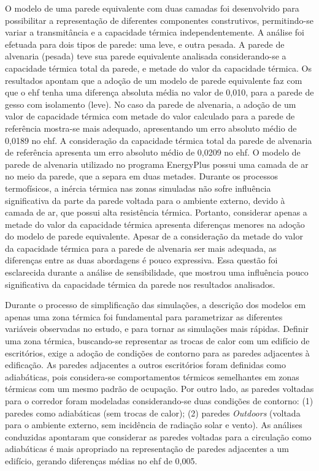\documentclass[brazil,hardcopy,openany]{ufscthesis} %
\begin{document}
	O modelo de uma parede equivalente com duas camadas foi desenvolvido para possibilitar a representação de diferentes componentes construtivos, permitindo-se variar a transmitância e a capacidade térmica independentemente. A análise foi efetuada para dois tipos de parede: uma leve, e outra pesada. A parede de alvenaria (pesada) teve sua parede equivalente analisada considerando-se a capacidade térmica total da parede, e metade do valor da capacidade térmica.
	Os resultados apontam que a adoção de um modelo de parede equivalente faz com que o \acrshort{ehf} tenha uma diferença absoluta média no valor de 0,010, para a parede de gesso com isolamento (leve).
	No caso da parede de alvenaria, a adoção de um valor de capacidade térmica com metade do valor calculado para a parede de referência mostra-se mais adequado, apresentando um erro absoluto médio de 0,0189 no \acrshort{ehf}. A consideração da capacidade térmica total da parede de alvenaria de referência apresenta um erro absoluto médio de 0,0209 no \acrshort{ehf}.
	O modelo de parede de alvenaria utilizado no programa EnergyPlus possui uma camada de ar no meio da parede, que a separa em duas metades. Durante os processos termofísicos, a inércia térmica nas zonas simuladas não sofre influência significativa da parte da parede voltada para o ambiente externo, devido à camada de ar, que possui alta resistência térmica. Portanto, considerar apenas a metade do valor da capacidade térmica apresenta diferenças menores na adoção do modelo de parede equivalente.
	Apesar de a consideração da metade do valor da capacidade térmica para a parede de alvenaria ser mais adequada, as diferenças entre as duas abordagens é pouco expressiva.
	Essa questão foi esclarecida durante a análise de sensibilidade, que mostrou uma influência pouco significativa da capacidade térmica da parede nos resultados analisados.
	
	Durante o processo de simplificação das simulações, a descrição dos modelos em apenas uma zona térmica foi fundamental para parametrizar as diferentes variáveis observadas no estudo, e para tornar as simulações mais rápidas.
	Definir uma zona térmica, buscando-se representar as trocas de calor com um edifício de escritórios, exige a adoção de condições de contorno para as paredes adjacentes à edificação. 
	As paredes adjacentes a outros escritórios foram definidas como adiabáticas, pois considera-se comportamentos térmicos semelhantes em zonas térmicas com um mesmo padrão de ocupação. 
	Por outro lado, as paredes voltadas para o corredor foram modeladas considerando-se duas condições de contorno: (1) paredes como adiabáticas (sem trocas de calor); (2) paredes \textit{Outdoors} (voltada para o ambiente externo, sem incidência de radiação solar e vento).
	As análises conduzidas apontaram que considerar as paredes voltadas para a circulação como adiabáticas é mais apropriado na representação de paredes adjacentes a um edifício, gerando diferenças médias no \acrshort{ehf} de 0,005.
	
\end{document}
